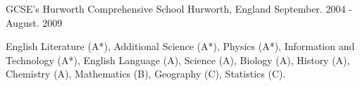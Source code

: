 \begin{cventries}
  \cventry
    {GCSE's} %
    {Hurworth Comprehensive School} %
    {Hurworth, England} %
    {September. 2004 - August. 2009} %
    {
      \begin{cvitems} %
        \item {English Literature (A*), Additional Science (A*), Physics (A*), Information and Technology (A*), English Language (A), Science (A), Biology (A), History (A), Chemistry (A), Mathematics (B), Geography (C), Statistics (C).}
      \end{cvitems}
    }
\end{cventries}
